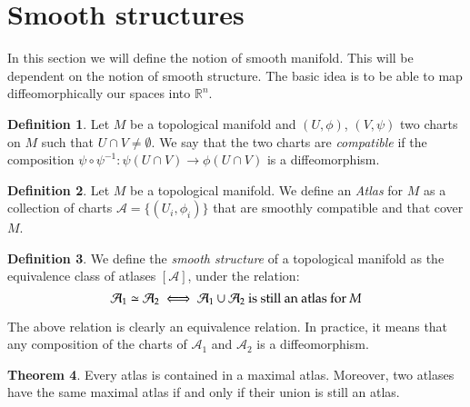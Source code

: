 \documentclass[12pt,a4paper]{report}
\theoremstyle{definition}
\newtheorem{Def}{Definition}[chapter]
\theoremstyle{Theorem}
\newtheorem{Theo}[Def]{Theorem}
\theoremstyle{break}
\theoremstyle{definition}
\begin{document}
		\section{Smooth structures}
		In this section we will define the notion of smooth manifold. This will be dependent on the notion of smooth structure. The basic idea is to be able to map diffeomorphically our spaces into $\mathbb{R}^n$.
		\begin{Def}
			Let $M$ be a topological manifold and $(U,\phi)$, $(V,\psi)$ two charts on $M$ such that $U\cap V\neq \emptyset$. We say that the two charts are \textit{compatible} if the composition $\psi\circ \psi^{-1}:\psi(U\cap V)\longrightarrow \phi(U\cap V)$ is a diffeomorphism.
		\end{Def}
		\begin{Def}
			Let $M$ be a topological manifold. We define an \textit{Atlas} for $M$ as a collection of charts $\mathcal{A}=\{(U_i,\phi_i)\}$ that are smoothly compatible and that cover $M$.
		\end{Def}
		\begin{Def}
			We define the \textit{smooth structure} of a topological manifold as the equivalence class of atlases $[\mathcal{A}]$, under the relation:
			$$\mathcal{A}_1\simeq \mathcal{A}_2\iff \mathcal{A}_1\cup \mathcal{A}_2 \hbox{ is still an atlas for }M$$
		\end{Def}
		The above relation is clearly an equivalence relation. In practice, it means that any composition of the charts of $\mathcal{A}_1$ and $\mathcal{A}_2$ is a diffeomorphism.
		\begin{Theo}
			Every atlas is contained in a maximal atlas. Moreover, two atlases have the same maximal atlas if and only if their union is still an atlas.
		\end{Theo} 
\end{document}
